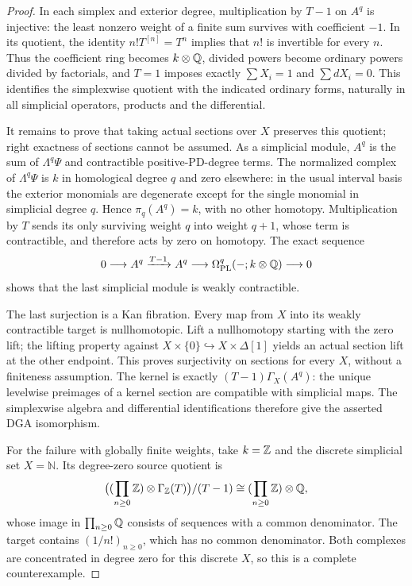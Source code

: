 \begin{proof}
In each simplex and exterior degree, multiplication by $T-1$ on
$A^q$ is injective: the least nonzero weight of a finite sum survives
with coefficient $-1$. In its quotient, the identity
$n!T^{[n]}=T^n$ implies that $n!$ is invertible for every $n$.
Thus the coefficient ring becomes $k\otimes\mathbb Q$, divided powers
become ordinary powers divided by factorials, and $T=1$ imposes
exactly $\sum X_i=1$ and $\sum dX_i=0$. This identifies the
simplexwise quotient with the indicated ordinary forms, naturally in
all simplicial operators, products and the differential.

It remains to prove that taking actual sections over $X$ preserves
this quotient; right exactness of sections cannot be assumed.
As a simplicial module, $A^q$ is the sum of $\Lambda^q\Psi$ and
contractible positive-PD-degree terms. The normalized complex of
$\Lambda^q\Psi$ is $k$ in homological degree $q$ and zero
elsewhere: in the usual interval basis the exterior monomials are
degenerate except for the single monomial in simplicial degree $q$.
Hence $\pi_q(A^q)=k$, with no other homotopy. Multiplication by
$T$ sends its only surviving weight $q$ into weight $q+1$, whose
term is contractible, and therefore acts by zero on homotopy.
The exact sequence
\[
 0\longrightarrow A^q\xrightarrow{T-1}A^q
 \longrightarrow\Omega^q_{\mathrm{PL}}(-;k\otimes\mathbb Q)
 \longrightarrow0
\]
shows that the last simplicial module is weakly contractible.

The last surjection is a Kan fibration. Every map from $X$ into
its weakly contractible target is nullhomotopic. Lift a nullhomotopy
starting with the zero lift; the lifting property against
$X\times\{0\}\hookrightarrow X\times\Delta[1]$ yields an
actual section lift at the other endpoint. This proves surjectivity
on sections for every $X$, without a finiteness assumption.
The kernel is exactly $(T-1)\Gamma_X(A^q)$: the unique levelwise
preimages of a kernel section are compatible with simplicial maps.
The simplexwise algebra and differential identifications therefore
give the asserted DGA isomorphism.

For the failure with globally finite weights, take $k=\mathbb Z$ and
the discrete simplicial set $X=\mathbb N$. Its degree-zero source
quotient is
\[
 \bigl((\prod_{n\geq0}\mathbb Z)\otimes\Gamma_{\mathbb Z}(T)\bigr)/(T-1)
 \cong(\prod_{n\geq0}\mathbb Z)\otimes\mathbb Q,
\]
whose image in $\prod_{n\geq0}\mathbb Q$ consists of sequences with a
common denominator. The target contains $(1/n!)_{n\geq0}$,
which has no common denominator. Both complexes are concentrated
in degree zero for this discrete $X$, so this is a complete
counterexample.
\end{proof}
